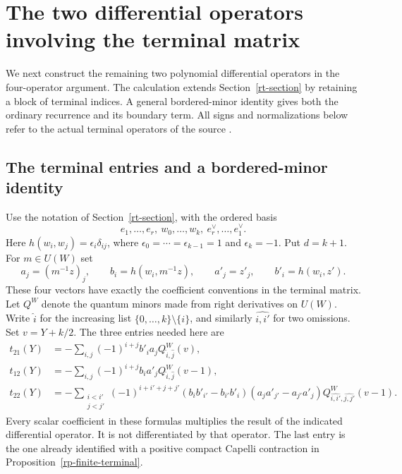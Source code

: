 \section{The two differential operators involving the terminal matrix}
\label{rc-section}

We next construct the remaining two polynomial differential
operators in the four-operator argument.  The calculation
extends Section~\ref{rt-section} by retaining a block of
terminal indices.  A general bordered-minor identity gives
both the ordinary recurrence and its boundary term.
All signs and normalizations below refer to the actual
terminal operators of the source \cite{alpo-uniform-source}.

\subsection{The terminal entries and a bordered-minor identity}

Use the notation of Section~\ref{rt-section}, with the
ordered basis
\[
 e_1,\ldots,e_r,\ w_0,\ldots,w_k,\
                         e_r^\vee,\ldots,e_1^\vee .
\]
Here $h(w_i,w_j)=\epsilon_i\delta_{ij}$, where
$\epsilon_0=\cdots=\epsilon_{k-1}=1$ and
$\epsilon_k=-1$.  Put $d=k+1$.
For $m\in U(W)$ set
\[
 a_j=(m^{-1}z)_j,\qquad b_i=h(w_i,m^{-1}z),
 \qquad a'_j=z'_j,\qquad b'_i=h(w_i,z').
\]
These four vectors have exactly the coefficient conventions
in the terminal matrix.  Let $Q^W$ denote the quantum
minors made from right derivatives on $U(W)$.
Write $\widehat i$ for the increasing list
$\{0,\ldots,k\}\setminus\{i\}$, and similarly
$\widehat{i,i'}$ for two omissions.  Set $v=Y+k/2$.
The three entries needed here are
\begin{align}
 t_{21}(Y)&=
 -\sum_{i,j}(-1)^{i+j}b'_i a_j
                    Q^W_{\widehat i,\widehat j}(v),
                                                     \label{rc-t21}\\
 t_{12}(Y)&=
 -\sum_{i,j}(-1)^{i+j}b_i a'_j
                    Q^W_{\widehat i,\widehat j}(v-1),
                                                     \label{rc-t12}\\
 t_{22}(Y)&=
 -\sum_{\substack{i<i'\\j<j'}}(-1)^{i+i'+j+j'}
     (b_i b'_{i'}-b_{i'}b'_i)
     (a_j a'_{j'}-a_{j'}a'_j)
                 Q^W_{\widehat{i,i'},\widehat{j,j'}}(v-1).
                                                     \label{rc-t22}
\end{align}
Every scalar coefficient in these formulas multiplies
the result of the indicated differential operator.
It is not differentiated by that operator.
The last entry is the one already identified with a
positive compact Capelli contraction in
Proposition~\ref{rp-finite-terminal}.

